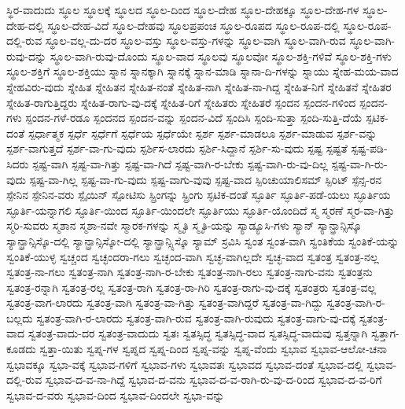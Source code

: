 {ಸ್ಥಿರ-ವಾದುದು
ಸ್ಥೂಲ
ಸ್ಥೂಲಕ್ಕೆ
ಸ್ಥೂಲದ
ಸ್ಥೂಲ-ದಿಂದ
ಸ್ಥೂಲ-ದೇಹ
ಸ್ಥೂಲ-ದೇಹಕ್ಕೂ
ಸ್ಥೂಲ-ದೇಹ-ಗಳ
ಸ್ಥೂಲ-ದೇಹ-ದಲ್ಲಿ
ಸ್ಥೂಲ-ದೇಹ-ವಿದೆ
ಸ್ಥೂಲ-ದೇಹವು
ಸ್ಥೂಲಪ್ರಪಂಚ
ಸ್ಥೂಲ-ರೂಪದ
ಸ್ಥೂಲ-ರೂಪ-ದಲ್ಲಿ
ಸ್ಥೂಲ-ರೂಪ-ದಲ್ಲಿ-ರುವ
ಸ್ಥೂಲ-ವಲ್ಲ-ದು-ದರ
ಸ್ಥೂಲ-ವಸ್ತು
ಸ್ಥೂಲ-ವಸ್ತು-ಗಳನ್ನು
ಸ್ಥೂಲ-ವಾಗಿ
ಸ್ಥೂಲ-ವಾಗಿ-ರುವ
ಸ್ಥೂಲ-ವಾಗಿ-ರುವು-ದನ್ನು
ಸ್ಥೂಲ-ವಾಗಿ-ರುವು-ದೊಂದು
ಸ್ಥೂಲ-ವಾದ
ಸ್ಥೂಲವು
ಸ್ಥೂಲವೋ
ಸ್ಥೂಲ-ಶಕ್ತಿ-ಗಳಿವೆ
ಸ್ಥೂಲ-ಶಕ್ತಿ-ಗಳು
ಸ್ಥೂಲ-ಶಕ್ತಿಗೆ
ಸ್ಥೂಲ-ಶಕ್ತಿಯು
ಸ್ನಾನ
ಸ್ನಾನಕ್ಕಾಗಿ
ಸ್ನಾನಕ್ಕೆ
ಸ್ನಾನ-ಮಾಡಿ
ಸ್ನಾನಾ-ದಿ-ಗಳನ್ನು
ಸ್ನಾಯು
ಸ್ನೇಹ-ಮಯ-ವಾದ
ಸ್ನೇಹವಿರು-ವುದು
ಸ್ನೇಹಿತ
ಸ್ನೇಹಿತನ
ಸ್ನೇಹಿತ-ನಂತೆ
ಸ್ನೇಹಿತ-ನಾಗಿ
ಸ್ನೇಹಿತ-ನಾ-ಗಿದ್ದ
ಸ್ನೇಹಿತ-ನಿಗೆ
ಸ್ನೇಹಿತನೆ
ಸ್ನೇಹಿತರ
ಸ್ನೇಹಿತ-ರಾಗುತ್ತಿದ್ದರು
ಸ್ನೇಹಿತ-ರಾಗು-ವು-ದಕ್ಕೆ
ಸ್ನೇಹಿತ-ರಿಗೆ
ಸ್ನೇಹಿತರು
ಸ್ನೇಹಿತರೆ
ಸ್ಪಂದನ
ಸ್ಪಂದನ-ಗಳಿಂದ
ಸ್ಪಂದನ-ಗಳು
ಸ್ಪಂದನ-ಗಳೆ-ರಡೂ
ಸ್ಪಂದನದ
ಸ್ಪಂದನ-ವನ್ನು
ಸ್ಪಂದನ-ವಿದೆ
ಸ್ಪಂದಿಸಿ
ಸ್ಪಂದಿ-ಸುತ್ತಾ
ಸ್ಪಂದಿ-ಸುತ್ತಿ-ದೆಯೆ
ಸ್ಪಟಿಕ-ದಂತೆ
ಸ್ಪರ್ಧಾತ್ಮಕ
ಸ್ಪರ್ಧೆ
ಸ್ಪರ್ಧೆಗೆ
ಸ್ಪರ್ಧೆಯ
ಸ್ಪರ್ಧೆಯೇ
ಸ್ಪರ್ಶ
ಸ್ಪರ್ಶ-ಮಾಡಲೂ
ಸ್ಪರ್ಶ-ಮಾಡುವ
ಸ್ಪರ್ಶ-ವನ್ನು
ಸ್ಪರ್ಶ-ವಾಗುತ್ತದೆ
ಸ್ಪರ್ಶ-ವಾ-ಗು-ವುದು
ಸ್ಪರ್ಶಿಸ-ಲಾರದು
ಸ್ಪರ್ಶಿ-ಸಿದ್ದಾನೆ
ಸ್ಪರ್ಶಿ-ಸು-ವುದು
ಸ್ಪಷ್ಟ
ಸ್ಪಷ್ಟತೆ
ಸ್ಪಷ್ಟ-ಪಡಿ-ಸಿದರು
ಸ್ಪಷ್ಟ-ವಾಗಿ
ಸ್ಪಷ್ಟ-ವಾ-ಗಿತ್ತು
ಸ್ಪಷ್ಟ-ವಾ-ಗಿದೆ
ಸ್ಪಷ್ಟ-ವಾಗಿ-ರ-ಬೇಕು
ಸ್ಪಷ್ಟ-ವಾಗಿ-ರು-ವು-ದಿಲ್ಲ
ಸ್ಪಷ್ಟ-ವಾ-ಗಿ-ರು-ವುದು
ಸ್ಪಷ್ಟ-ವಾ-ಗಿಲ್ಲ
ಸ್ಪಷ್ಟ-ವಾ-ಗು-ವುದು
ಸ್ಪಷ್ಟ-ವಾಗು-ವುವು
ಸ್ಪಷ್ಟ-ವಾದ
ಸ್ಪಿರಿಚುಯಾಲಿಸಮ್
ಸ್ಪಿರಿಟ್
ಸ್ಪೆನ್ಸ-ರನ
ಸ್ಪೇನಿನ
ಸ್ಪೇನಿನ-ವರು
ಸ್ಪೈಯಿನ್
ಸ್ಪೋಟಿಸು
ಸ್ಪ್ರಿಂಗನ್ನು
ಸ್ಪ್ರಿಂಗು
ಸ್ಫಟಿಕ-ದಂತೆ
ಸ್ಫೂರ್ತಿ
ಸ್ಫೂರ್ತಿ-ಪಡೆ-ಯಲು
ಸ್ಫೂರ್ತಿಯ
ಸ್ಫೂರ್ತಿ-ಯನ್ನಾಗಲಿ
ಸ್ಫೂರ್ತಿ-ಯಿಂದ
ಸ್ಫೂರ್ತಿ-ಯಿಂದಲೇ
ಸ್ಫೂರ್ತಿಯು
ಸ್ಫೂರ್ತಿ-ಯೊಂದಿದೆ
ಸ್ಮ
ಸ್ಮರಣೆ
ಸ್ಮರ-ವಾ-ಗಿತ್ತು
ಸ್ಮರಿ-ಸುವರು
ಸ್ಮಶಾನ
ಸ್ಮಶಾ-ನವೇ
ಸ್ಮಾರಕ-ಗಳನ್ನು
ಸ್ಮೃತಿ
ಸ್ಮೃತಿ-ಯನ್ನು
ಸ್ಯಾಡ್ಯೂಸಿ-ಗಳು
ಸ್ಯಾನ್
ಸ್ಯಾನ್ಫ್ರಾನ್ಸಿಸ್ಕೊ
ಸ್ಯಾನ್ಫ್ರಾನ್ಸಿಸ್ಕೊ-ದಲ್ಲಿ
ಸ್ಯಾನ್ಫ್ರಾನ್ಸಿಸ್ಕೋ-ದಲ್ಲಿ
ಸ್ಯಾನ್ಫ್ರಾನ್ಸ್ಸಿಸ್ಕೊ
ಸ್ಯಾಮ್
ಸ್ರವಿಸಿ
ಸ್ವಂತ
ಸ್ವಂತ-ವಾಗಿ
ಸ್ವಂತಿಕೆಯ
ಸ್ವಂತಿಕೆ-ಯನ್ನು
ಸ್ವಂತಿಕೆ-ಯುಳ್ಳ
ಸ್ವಚ್ಚಂದ
ಸ್ವಚ್ಛಂದರಾ-ಗಲು
ಸ್ವಚ್ಛಂದ-ವಾಗಿ
ಸ್ವಚ್ಛ-ವಾಗಿಲ್ಲದೇ
ಸ್ವಚ್ಛ-ವಾದ
ಸ್ವತಂತ್ರ
ಸ್ವತಂತ್ರ-ನಲ್ಲ
ಸ್ವತಂತ್ರ-ನಾ-ಗಲು
ಸ್ವತಂತ್ರ-ನಾಗಿ
ಸ್ವತಂತ್ರ-ನಾಗಿ-ರ-ಬೇಕು
ಸ್ವತಂತ್ರ-ನಾಗಿ-ರಲು
ಸ್ವತಂತ್ರ-ನಾಗು-ವನು
ಸ್ವತಂತ್ರನು
ಸ್ವತಂತ್ರ-ರನ್ನಾಗಿ
ಸ್ವತಂತ್ರ-ರಲ್ಲ
ಸ್ವತಂತ್ರ-ರಾಗಿ
ಸ್ವತಂತ್ರ-ರಾ-ಗಿರಿ
ಸ್ವತಂತ್ರ-ರಾಗು-ವು-ದಕ್ಕೆ
ಸ್ವತಂತ್ರರು
ಸ್ವತಂತ್ರ-ವಲ್ಲ
ಸ್ವತಂತ್ರ-ವಾಗ-ಲಾರದು
ಸ್ವತಂತ್ರ-ವಾಗಿ
ಸ್ವತಂತ್ರ-ವಾ-ಗಿತ್ತು
ಸ್ವತಂತ್ರ-ವಾಗಿದ್ದರೆ
ಸ್ವತಂತ್ರ-ವಾ-ಗಿದ್ದು
ಸ್ವತಂತ್ರ-ವಾಗಿ-ರ-ಬಲ್ಲದು
ಸ್ವತಂತ್ರ-ವಾಗಿ-ರ-ಲಾರದು
ಸ್ವತಂತ್ರ-ವಾಗಿ-ರುವ
ಸ್ವತಂತ್ರ-ವಾಗಿ-ರುವುದು
ಸ್ವತಂತ್ರ-ವಾಗು-ವು-ದಕ್ಕೆ
ಸ್ವತಂತ್ರ-ವಾದ
ಸ್ವತಂತ್ರ-ವಾದು-ದರ
ಸ್ವತಂತ್ರ-ವಾದುದು
ಸ್ವತಃ
ಸ್ವತಸ್ಸಿದ್ಧ
ಸ್ವತಸ್ಸಿದ್ಧ-ವಾದ
ಸ್ವತಸ್ಸಿದ್ಧ-ವಾದುವು
ಸ್ವತ್ತನ್ನಾಗಿ
ಸ್ವತ್ತಾಗ-ಕೂಡದು
ಸ್ವತ್ತಾ-ಯಿತು
ಸ್ವಪ್ನ-ಗಳ
ಸ್ವಪ್ನದ
ಸ್ವಪ್ನ-ದಿಂದ
ಸ್ವಪ್ನ-ವನ್ನು
ಸ್ವಪ್ನ-ವೆಂದು
ಸ್ವಭಾವ
ಸ್ವಭಾವ-ಆಲೋ-ಚನಾ
ಸ್ವಭಾವಕ್ಕೂ
ಸ್ವಭಾ-ವಕ್ಕೆ
ಸ್ವಭಾವ-ಗಳಿಗೆ
ಸ್ವಭಾವ-ಗಳು
ಸ್ವಭಾವತಃ
ಸ್ವಭಾವದ
ಸ್ವಭಾವ-ದಂತೆ
ಸ್ವಭಾವ-ದಲ್ಲಿ
ಸ್ವಭಾವ-ದಲ್ಲಿ-ರುವ
ಸ್ವಭಾವ-ದ-ವ-ನಾ-ಗಿದ್ದೆ
ಸ್ವಭಾವ-ದ-ವನು
ಸ್ವಭಾವ-ದ-ವ-ರಾಗಿ-ರು-ವು-ದ-ರಿಂದ
ಸ್ವಭಾವ-ದ-ವ-ರಿಗೆ
ಸ್ವಭಾವ-ದ-ವರು
ಸ್ವಭಾವ-ದಿಂದ
ಸ್ವಭಾವ-ದಿಂದಲೇ
ಸ್ವಭಾ-ವನ್ನು
}
